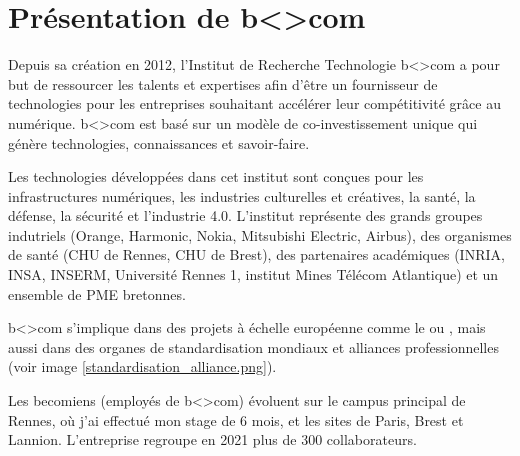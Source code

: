 \chapter{Présentation de b<>com}

\par
Depuis sa création en 2012, l'Institut de Recherche Technologie b<>com a pour but de ressourcer les talents et expertises afin d’être un fournisseur de technologies pour les entreprises souhaitant accélérer leur compétitivité grâce au numérique. b<>com est basé sur un modèle de co-investissement unique qui génère technologies, connaissances et savoir-faire.


\par
Les technologies développées dans cet institut sont conçues pour les infrastructures numériques, les industries culturelles et créatives, la santé, la défense, la sécurité et l’industrie 4.0. L'institut représente des grands groupes indutriels (Orange, Harmonic, Nokia, Mitsubishi Electric, Airbus), des organismes de santé (CHU de Rennes, CHU de Brest), des partenaires académiques (INRIA, INSA, INSERM, Université Rennes 1, institut Mines Télécom Atlantique) et un ensemble de PME bretonnes.

\par
b<>com s'implique dans des projets à échelle européenne comme le  ou , mais aussi dans des organes de standardisation mondiaux et alliances professionnelles (voir image \ref{standardisation_alliance.png}).


\par
Les becomiens (employés de b<>com) évoluent sur le campus principal de Rennes, où j'ai effectué mon stage de 6 mois, et les sites de Paris, Brest et Lannion. L’entreprise regroupe en 2021 plus de 300 collaborateurs.

\newpage


